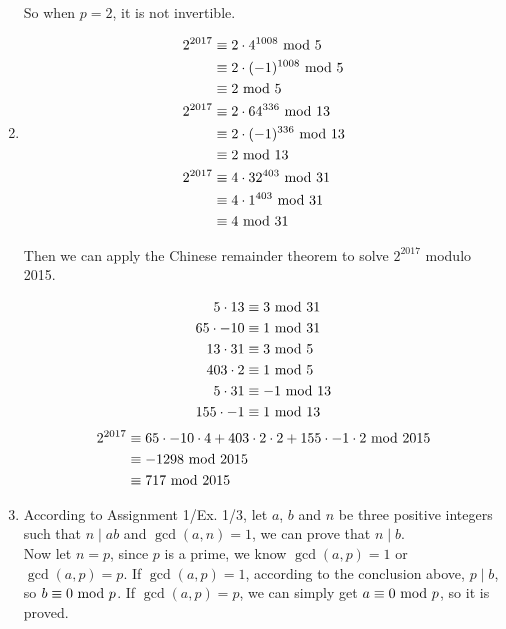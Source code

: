 \documentclass{article}
\renewcommand{\mod}{{\rm\ mod\ }}
\begin{document}
\begin{enumerate}
So when $p=2$, it is not invertible.

\item
\begin{align*}
2^{2017}&\equiv 2\cdot 4^{1008}\mod 5\\
&\equiv 2\cdot (-1)^{1008}\mod 5\\
&\equiv 2\mod 5\\
2^{2017}&\equiv 2\cdot 64^{336}\mod 13\\
&\equiv 2\cdot (-1)^{336}\mod 13\\
&\equiv 2\mod 13\\
2^{2017}&\equiv 4\cdot 32^{403}\mod 31\\
&\equiv 4\cdot 1^{403}\mod 31\\
&\equiv 4\mod 31
\end{align*}

Then we can apply the Chinese remainder theorem to solve $2^{2017}$ modulo 2015.

\begin{align*}
5\cdot13&\equiv 3\mod 31\\
65\cdot-10&\equiv 1\mod 31\\
13\cdot31&\equiv 3\mod 5\\
403\cdot2&\equiv 1\mod 5\\
5\cdot31&\equiv -1\mod 13\\
155\cdot-1&\equiv 1\mod 13
\end{align*}
\begin{align*}
2^{2017}&\equiv 65\cdot-10\cdot4+403\cdot2\cdot2+155\cdot-1\cdot2\mod 2015\\
&\equiv -1298\mod 2015\\
&\equiv 717\mod 2015\\
\end{align*}

\item
According to Assignment 1/Ex. 1/3, let $a$, $b$ and $n$ be three positive integers such that $n\mid ab$ and $\gcd(a,n)=1$, we can prove that $n\mid b$.\\
Now let $n=p$, since $p$ is a prime, we know $\gcd(a,p)=1$ or $\gcd(a,p)=p$. If $\gcd(a,p)=1$, according to the conclusion above, $p\mid b$, so $b\equiv0\mod p$. If $\gcd(a,p)=p$, we can simply get $a\equiv0\mod p$, so it is proved.

\end{enumerate}
\end{document}
